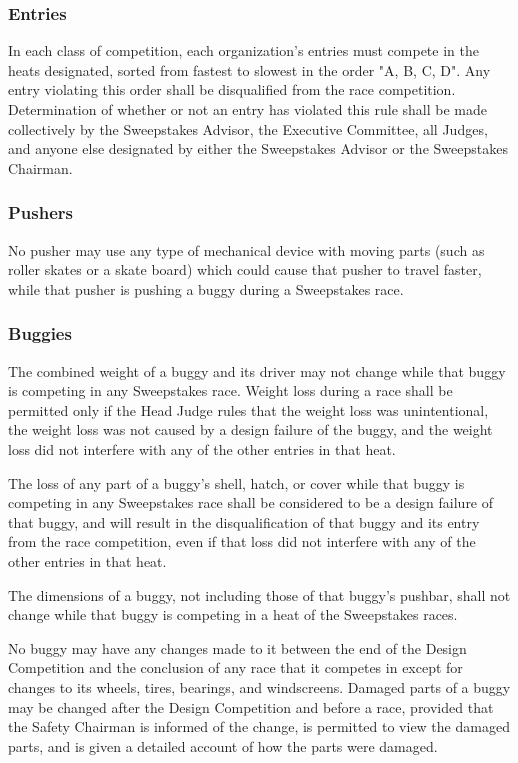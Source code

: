 \subsubsection{Entries}

	In each class of competition, each organization's entries must compete in the
	heats designated, sorted from fastest to slowest in the order "A, B, C, D". 
	Any entry violating this order shall be disqualified from the race competition. 
	Determination of whether or not an entry has violated this rule shall be made 
	collectively by the Sweepstakes Advisor, the Executive Committee, all Judges,
	and anyone else designated by either the Sweepstakes Advisor or the Sweepstakes 
	Chairman.

\subsubsection{Pushers}

	No pusher may use any type of mechanical device with moving parts (such as
	roller skates or a skate board) which could cause that pusher to travel faster,
	while that pusher is pushing a buggy during a Sweepstakes race.

\subsubsection{Buggies}

	The combined weight of a buggy and its driver may not change while that buggy
	is competing in any Sweepstakes race. Weight loss during a race shall be
	permitted only if the Head Judge rules that the weight loss was unintentional,
	the weight loss was not caused by a design failure of the buggy, and the weight
	loss did not interfere with any of the other entries in that heat.

	The loss of any part of a buggy's shell, hatch, or cover while that buggy is
	competing in any Sweepstakes race shall be considered to be a design failure of
	that buggy, and will result in the disqualification of that buggy and its entry
	from the race competition, even if that loss did not interfere with any of the
	other entries in that heat.

	The dimensions of a buggy, not including those of that buggy's pushbar, shall
	not change while that buggy is competing in a heat of the Sweepstakes races.

	No buggy may have any changes made to it between the end of the Design
	Competition and the conclusion of any race that it competes in except for
	changes to its wheels, tires, bearings, and windscreens. Damaged parts of a
	buggy may be changed after the Design Competition and before a race, provided
	that the Safety Chairman is informed of the change, is permitted to view the
	damaged parts, and is given a detailed account of how the parts were damaged.

